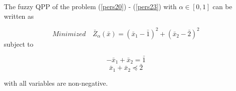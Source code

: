 \documentclass{iaesarticle3}
\begin{document}
The fuzzy QPP of the problem (\ref{pers20}) - (\ref{pers23}) with $\alpha \in [0,1]$ can be written as

\begin{equation}\label{pers24}
    Minimized \quad \bar{Z}_\alpha (\bar{x}) = (\bar{x}_1 - \bar{1})^2 + (\bar{x}_2 - \bar{2})^2
\end{equation}
\noindent
subject to

\begin{equation}\label{pers25}
    -\bar{x}_1 + \bar{x}_2 = \bar{1}
\end{equation}
\begin{equation}\label{pers26}
    \bar{x}_1 + \bar{x}_2 \preceq \bar{2}
\end{equation}

with all variables are non-negative.
\end{document}
